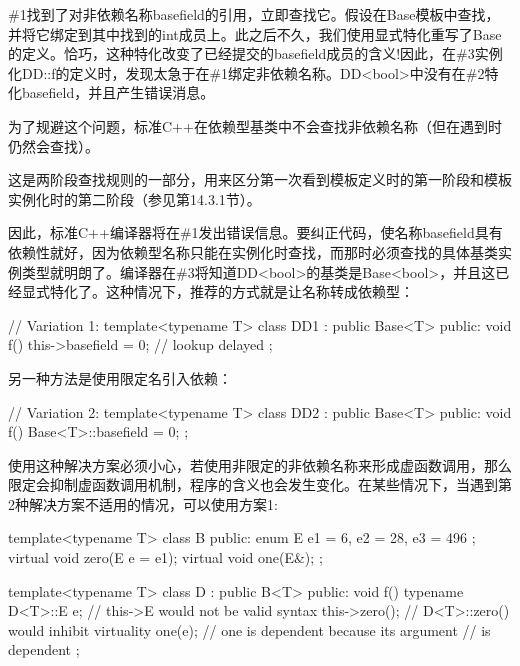 
\#1找到了对非依赖名称basefield的引用，立即查找它。假设在Base模板中查找，并将它绑定到其中找到的int成员上。此之后不久，我们使用显式特化重写了Base的定义。恰巧，这种特化改变了已经提交的basefield成员的含义!因此，在\#3实例化DD::f的定义时，发现太急于在\#1绑定非依赖名称。DD<bool>中没有在\#2特化basefield，并且产生错误消息。

为了规避这个问题，标准C++在依赖型基类中不会查找非依赖名称（但在遇到时仍然会查找）。

\begin{notice}
这是两阶段查找规则的一部分，用来区分第一次看到模板定义时的第一阶段和模板实例化时的第二阶段（参见第14.3.1节）。
\end{notice}

因此，标准C++编译器将在\#1发出错误信息。要纠正代码，使名称basefield具有依赖性就好，因为依赖型名称只能在实例化时查找，而那时必须查找的具体基类实例类型就明朗了。编译器在\#3将知道DD<bool>的基类是Base<bool>，并且这已经显式特化了。这种情况下，推荐的方式就是让名称转成依赖型：

\begin{cpp}
// Variation 1:
template<typename T>
class DD1 : public Base<T> {
	public:
	void f() { this->basefield = 0; } // lookup delayed
};
\end{cpp}

另一种方法是使用限定名引入依赖：

\begin{cpp}
// Variation 2:
template<typename T>
class DD2 : public Base<T> {
	public:
	void f() { Base<T>::basefield = 0; }
};
\end{cpp}

使用这种解决方案必须小心，若使用非限定的非依赖名称来形成虚函数调用，那么限定会抑制虚函数调用机制，程序的含义也会发生变化。在某些情况下，当遇到第2种解决方案不适用的情况，可以使用方案1:

\begin{cpp}
template<typename T>
class B {
	public:
	enum E { e1 = 6, e2 = 28, e3 = 496 };
	virtual void zero(E e = e1);
	virtual void one(E&);
};

template<typename T>
class D : public B<T> {
	public:
	void f() {
		typename D<T>::E e; // this->E would not be valid syntax
		this->zero(); // D<T>::zero() would inhibit virtuality
		one(e); // one is dependent because its argument
	} // is dependent
};
\end{cpp}

